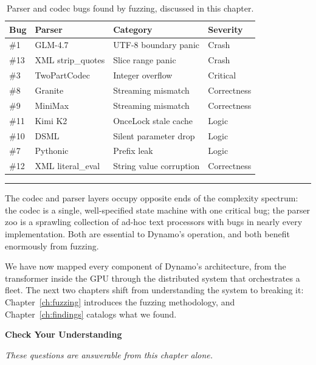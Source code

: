 \medskip
\begin{table}[h]
\centering
\small
\begin{tabular}{llll}
\hline
\textbf{Bug} & \textbf{Parser} & \textbf{Category} & \textbf{Severity} \\
\hline
\#1  & GLM-4.7           & UTF-8 boundary panic       & Crash \\
\#13 & XML strip\_quotes  & Slice range panic          & Crash \\
\#3  & TwoPartCodec      & Integer overflow           & Critical \\
\#8  & Granite           & Streaming mismatch         & Correctness \\
\#9  & MiniMax           & Streaming mismatch         & Correctness \\
\#11 & Kimi K2           & OnceLock stale cache       & Logic \\
\#10 & DSML              & Silent parameter drop      & Logic \\
\#7  & Pythonic          & Prefix leak                & Logic \\
\#12 & XML literal\_eval  & String value corruption    & Correctness \\
\hline
\end{tabular}
\caption{Parser and codec bugs found by fuzzing, discussed in this chapter.}
\label{tab:parser-bugs}
\end{table}

\medskip
\begin{center}\rule{0.5\linewidth}{0.4pt}\end{center}
\medskip

The codec and parser layers occupy opposite ends of the complexity spectrum: the codec is a single, well-specified state machine with one critical bug; the parser zoo is a sprawling collection of ad-hoc text processors with bugs in nearly every implementation. Both are essential to Dynamo's operation, and both benefit enormously from fuzzing.

We have now mapped every component of Dynamo's architecture, from the transformer inside the GPU through the distributed system that orchestrates a fleet. The next two chapters shift from understanding the system to breaking it: Chapter~\ref{ch:fuzzing} introduces the fuzzing methodology, and Chapter~\ref{ch:findings} catalogs what we found.

\medskip
\noindent\textbf{Check Your Understanding}

\smallskip
\noindent\emph{These questions are answerable from this chapter alone.}

